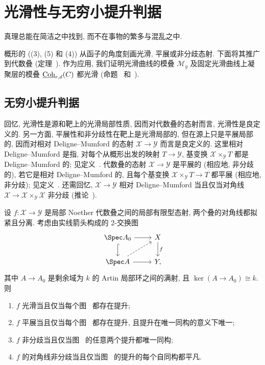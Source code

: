 \section{光滑性与无穷小提升判据}\label{src:4.7-section}
\begin{epigraph}
真理总能在简洁之中找到, 而不在事物的繁多与混乱之中.
\end{epigraph}
概形的 ((3), (5) 和 (4)) 从函子的角度刻画光滑, 平展或非分歧态射. 下面将其推广到代数叠 (定理~). 作为应用, 我们证明光滑曲线的模叠 $\mathcal M_g$ 及固定光滑曲线上凝聚层的模叠 $\underline{\mathrm{Coh}}_{r,d}(C)$ 都光滑 (命题~ 和~).
\subsection{无穷小提升判据}\label{src:4.7.1-subsection}
回忆, 光滑性是源和靶上的光滑局部性质, 因而对代数叠的态射而言, 光滑性是良定义的. 另一方面, 平展性和非分歧性在靶上是光滑局部的, 但在源上只是平展局部的, 因而对相对 Deligne--Mumford 的态射 $\mathcal X\to\mathcal Y$ 而言是良定义的. 这里相对 Deligne--Mumford 是指, 对每个从概形出发的映射 $T\to\mathcal Y$, 基变换 $\mathcal X\times_{\mathcal Y}T$ 都是 Deligne--Mumford 的; 见定义~. 代数叠的态射 $\mathcal X\to\mathcal Y$ 是平展的 (相应地, 非分歧的), 若它是相对 Deligne--Mumford 的, 且每个基变换 $\mathcal X\times_{\mathcal Y}T\to T$ 都平展 (相应地, 非分歧); 见定义~. 还需回忆, $\mathcal X\to\mathcal Y$ 相对 Deligne--Mumford 当且仅当对角线 $\mathcal X\to\mathcal X\times_{\mathcal Y}\mathcal X$ 非分歧 (推论~).
\begin{theorem}\label{src:4.7.1}
设 $f:\mathcal X\to\mathcal Y$ 是局部 Noether 代数叠之间的局部有限型态射, 两个叠的对角线都拟紧且分离. 考虑由实线箭头构成的 $2$-交换图
\begin{equation}\label{src:4.7.2}
\begin{tikzcd}
\Spec A_0\arrow[r]\arrow[d,hook]&\mathcal X\arrow[d,"f"]\\
\Spec A\arrow[r]\arrow[ur,dashed]&\mathcal Y,
\end{tikzcd}
\end{equation}
其中 $A\to A_0$ 是剩余域为 $k$ 的 Artin 局部环之间的满射, 且 $\ker(A\to A_0)\cong k$. 则
\begin{enumerate}[(1)]
\item $f$ 光滑当且仅当每个图~ 都存在提升;
\item $f$ 平展当且仅当每个图~ 都存在提升, 且提升在唯一同构的意义下唯一;
\item $f$ 非分歧当且仅当图~ 的任意两个提升都唯一同构;
\item $f$ 的对角线非分歧当且仅当图~ 的提升的每个自同构都平凡.
\end{enumerate}
\end{theorem}
